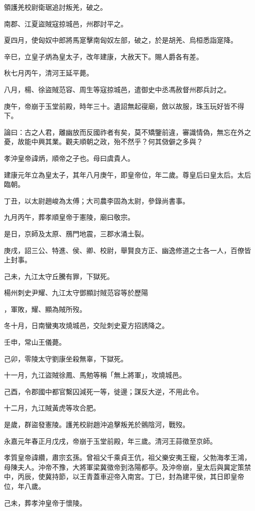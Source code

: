 \begin{pinyinscope}
領護羌校尉衛琚追討叛羌，破之。

南郡、江夏盜賊寇掠城邑，州郡討平之。

夏四月，使匈奴中郎將馬寔擊南匈奴左部，破之，於是胡羌、烏桓悉詣寔降。

辛巳，立皇子炳為皇太子，改年建康，大赦天下。賜人爵各有差。

秋七月丙午，清河王延平薨。

八月，楊、徐盜賊范容、周生等寇掠城邑，遣御史中丞馮赦督州郡兵討之。

庚午，帝崩于玉堂前殿，時年三十。遺詔無起寑廟，斂以故服，珠玉玩好皆不得下。

論曰：古之人君，離幽放而反國祚者有矣，莫不矯鑒前違，審識情偽，無忘在外之憂，故能中興其業。觀夫順朝之政，殆不然乎？何其傚僻之多與？

孝沖皇帝諱炳，順帝之子也。母曰虞貴人。

建康元年立為皇太子，其年八月庚午，即皇帝位，年二歲。尊皇后曰皇太后。太后臨朝。

丁丑，以太尉趙峻為太傅；大司農李固為太尉，參錄尚書事。

九月丙午，葬孝順皇帝于憲陵，廟曰敬宗。

是日，京師及太原、鴈門地震，三郡水涌土裂。

庚戌，詔三公、特進、侯、卿、校尉，舉賢良方正、幽逸修道之士各一人，百僚皆上封事。

己未，九江太守丘騰有罪，下獄死。

楊州刺史尹耀、九江太守鄧顯討賊范容等於歷陽

，軍敗，耀、顯為賊所歿。

冬十月，日南蠻夷攻燒城邑，交阯刺史夏方招誘降之。

壬申，常山王儀薨。

己卯，零陵太守劉康坐殺無辜，下獄死。

十一月，九江盜賊徐鳳、馬勉等稱「無上將軍」，攻燒城邑。

己酉，令郡國中都官繫囚減死一等，徙邊；謀反大逆，不用此令。

十二月，九江賊黃虎等攻合肥。

是歲，群盜發憲陵。護羌校尉趙沖追擊叛羌於鸇陰河，戰歿。

永嘉元年春正月戊戌，帝崩于玉堂前殿，年三歲。清河王蒜徵至京師。

孝質皇帝諱纘，肅宗玄孫。曾祖父千乘貞王伉，祖父樂安夷王寵，父勃海孝王鴻，母陳夫人。沖帝不豫，大將軍梁冀徵帝到洛陽都亭。及沖帝崩，皇太后與冀定策禁中，丙辰，使冀持節，以王青蓋車迎帝入南宮。丁巳，封為建平侯，其日即皇帝位，年八歲。

己未，葬孝沖皇帝于懷陵。


\end{pinyinscope}
